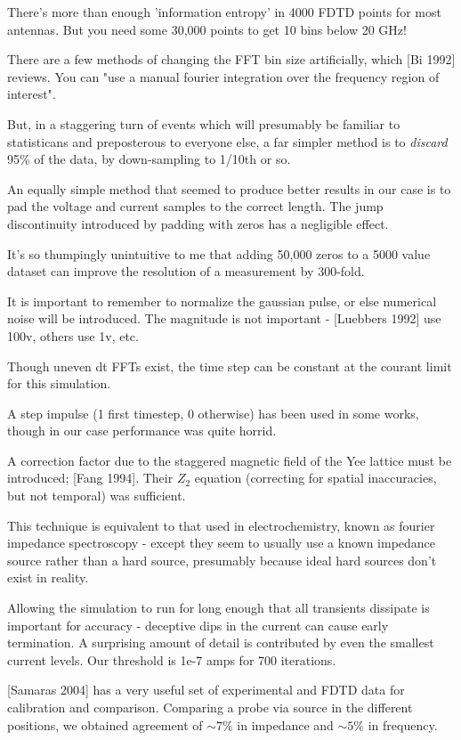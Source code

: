 \documentclass[paper.tex]{subfiles}
\begin{document}
There's more than enough 'information entropy' in 4000 FDTD points for most antennas. But you need some 30,000 points to get 10 bins below 20 GHz!

There are a few methods of changing the FFT bin size artificially, which [Bi 1992] reviews. You can "use a manual fourier integration over the frequency region of interest".

But, in a staggering turn of events which will presumably be familiar to statisticans and preposterous to everyone else, a far simpler method is to {\it discard} 95\% of the data, by down-sampling to 1/10th or so.

An equally simple method that seemed to produce better results in our case is to pad the voltage and current samples to the correct length. The jump discontinuity introduced by padding with zeros has a negligible effect.

It's so thumpingly unintuitive to me that adding 50,000 zeros to a 5000 value dataset can improve the resolution of a measurement by 300-fold.

It is important to remember to normalize the gaussian pulse, or else numerical noise will be introduced. The magnitude is not important - [Luebbers 1992] use 100v, others use 1v, etc.

Though uneven dt FFTs exist, the time step can be constant at the courant limit for this simulation.

A step impulse (1 first timestep, 0 otherwise) has been used in some works, though in our case performance was quite horrid.

A correction factor due to the staggered magnetic field of the Yee lattice must be introduced; [Fang 1994]. Their $Z_2$ equation (correcting for spatial inaccuracies, but not temporal) was sufficient.


This technique is equivalent to that used in electrochemistry, known as fourier impedance spectroscopy - except they seem to usually use a known impedance source rather than a hard source, presumably because ideal hard sources don't exist in reality.

Allowing the simulation to run for long enough that all transients dissipate is important for accuracy - deceptive dips in the current can cause early termination. A surprising amount of detail is contributed by even the smallest current levels. Our threshold is 1e-7 amps for 700 iterations.

[Samaras 2004] has a very useful set of experimental and FDTD data for calibration and comparison. Comparing a probe via source in the different positions, we obtained agreement of $\sim 7\%$ in impedance and $\sim 5\%$ in frequency.
\end{document}

